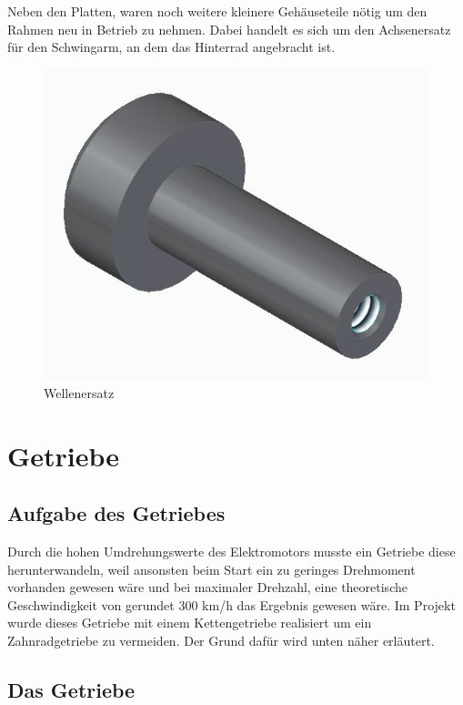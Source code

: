 Neben den Platten, waren noch weitere kleinere Gehäuseteile nötig um den Rahmen neu in Betrieb zu nehmen. Dabei handelt es sich um den Achsenersatz für den Schwingarm, an dem das Hinterrad angebracht ist. 

\begin{figure} [H]
	\begin{center}
		\includegraphics[scale=0.2]{figures/mechanik/Welle_Rechts.jpg}
			\caption{Wellenersatz}
			\label{fig:Wellenersatz}
	\end{center}
\end{figure}

\newpage

\section{Getriebe}

\subsection{Aufgabe des Getriebes}

Durch die hohen Umdrehungswerte des Elektromotors musste ein Getriebe diese herunterwandeln, weil ansonsten beim Start ein zu geringes Drehmoment vorhanden gewesen wäre und bei maximaler Drehzahl, eine theoretische Geschwindigkeit von gerundet 300 km/h das Ergebnis gewesen wäre. Im Projekt wurde dieses Getriebe mit einem Kettengetriebe realisiert um ein Zahnradgetriebe zu vermeiden. Der Grund dafür wird unten näher erläutert.

\subsection{Das Getriebe}

